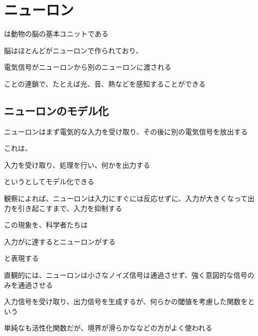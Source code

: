 \documentclass[../../../topic_deep-learning]{subfiles}
\begin{document}
\sectionline
\section{ニューロン}

は動物の脳の基本ユニットである

脳はほとんどがニューロンで作られており、
\begin{shaded}
  電気信号がニューロンから別のニューロンに渡される
\end{shaded}
ことの連鎖で、たとえば光、音、熱などを感知することができる

\subsection{ニューロンのモデル化}

ニューロンはまず電気的な入力を受け取り、その後に別の電気信号を放出する

これは、
\begin{shaded}
  入力を受け取り、処理を行い、何かを出力する
\end{shaded}
というとしてモデル化できる

\sectionline

観察によれば、ニューロンは入力にすぐには反応せずに、入力が大きくなって出力を引き起こすまで、入力を抑制する

この現象を、科学者たちは
\begin{shaded}
  入力がに達するとニューロンがする
\end{shaded}
と表現する

直観的には、ニューロンは小さなノイズ信号は通過させず、強く意図的な信号のみを通過させる

\br

入力信号を受け取り、出力信号を生成するが、何らかの閾値を考慮した関数をという

単純なも活性化関数だが、境界が滑らかななどの方がよく使われる
\end{document}
